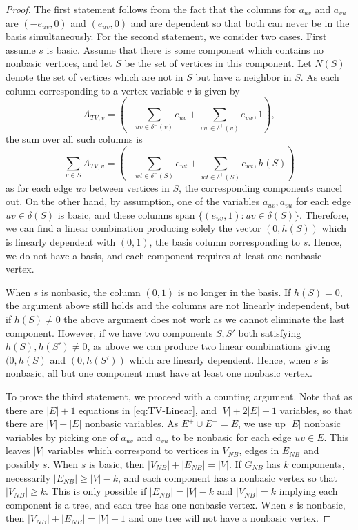 \documentclass[titlepage,11pt]{article}
\begin{document}
\begin{proof}
    The first statement follows from the fact that the columns for $a_{uv}$ and $a_{vu}$ are $(-e_{uv}, 0)$ and $(e_{uv}, 0)$ and are dependent so that both can never be in the basis simultaneously.
    For the second statement, we consider two cases. First assume $s$ is basic. Assume that there is some component which contains no nonbasic vertices, and let $S$ be the set of vertices in this component. Let $N(S)$ denote the set of vertices which are not in $S$ but have a neighbor in $S$. As each column corresponding to a vertex variable $v$ is given by
    \[
        A_{TV,v} = (-\sum_{uv \in \delta^-(v)}e_{uv} + \sum_{vw\in \delta^+(v)}e_{vw}, 1),
    \]
    the sum over all such columns is
    \[
        \sum_{v\in S} A_{TV,v} = (-\sum_{wt \in \delta^-(S)}e_{wt} + \sum_{wt \in \delta^+(S)}e_{wt}, h(S))
    \]
    as for each edge $uv$ between vertices in $S$, the corresponding components cancel out. On the other hand, by assumption, one of the variables $a_{uv}, a_{vu}$ for each edge $uv \in \delta(S)$ is basic, and these columns span $\{(e_{uv},1): uv \in \delta(S)\}$. Therefore, we can find a linear combination producing solely the vector $(0, h(S))$ which is linearly dependent with $(0,1)$, the basis column corresponding to $s$. Hence, we do not have a basis, and each component requires at least one nonbasic vertex.

    When $s$ is nonbasic, the column $(0,1)$ is no longer in the basis. If $h(S) = 0$, the argument above still holds and the columns are not linearly independent, but if $h(S) \ne 0$ the above argument does not work as we cannot eliminate the last component. However, if we have two components $S, S'$ both satisfying $h(S), h(S')\ne 0 $, as above we can produce two linear combinations giving $(0, h(S)$ and $(0, h(S'))$ which are linearly dependent. Hence, when $s$ is nonbasic, all but one component must have at least one nonbasic vertex.

    To prove the third statement, we proceed with a counting argument. Note that as there are $|E| + 1$ equations in \eqref{eq:TV-Linear}, and $|V| + 2|E| + 1$ variables, so that there are $|V| + |E|$ nonbasic variables. As $E^+ \cup E^- = E$, we use up $|E|$ nonbasic variables by picking one of $a_{uv}$ and $a_{vu}$ to be nonbasic for each edge $uv \in E$. This leaves $|V|$ variables which correspond to vertices in $V_{NB}$, edges in $E_{NB}$ and possibly $s$. When $s$ is basic, then $|V_{NB}| + |E_{NB}| = |V|$. If $G_{NB}$ has $k$ components, necessarily  $|E_{NB}| \ge |V|-k$, and each component has a nonbasic vertex so that $|V_{NB}| \ge k.$ This is only possible if $|E_{NB}| = |V|-k$ and $|V_{NB}| = k$ implying each component is a tree, and each tree has one nonbasic vertex. When $s$ is nonbasic, then $|V_{NB}| + |E_{NB}| = |V|-1$ and one tree will not have a nonbasic vertex. 
\end{proof}
\end{document}
